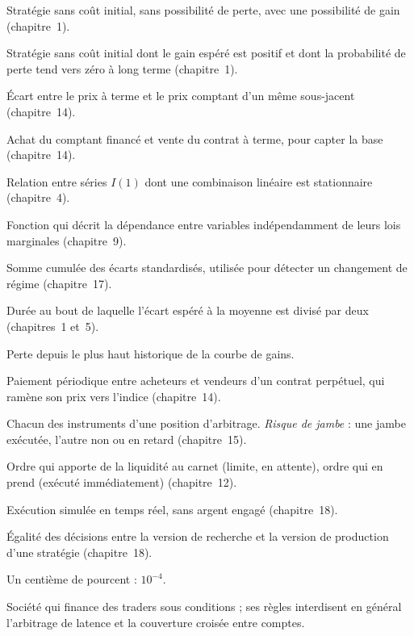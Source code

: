 \begin{description}[leftmargin=0pt,itemsep=0.3em]
\item[Arbitrage pur.] Stratégie sans coût initial, sans possibilité de perte, avec une possibilité de gain (chapitre~1).
\item[Arbitrage statistique.] Stratégie sans coût initial dont le gain espéré est positif et dont la probabilité de perte tend vers zéro à long terme (chapitre~1).
\item[Base.] Écart entre le prix à terme et le prix comptant d'un même sous-jacent (chapitre~14).
\item[\emph{Cash-and-carry}.] Achat du comptant financé et vente du contrat à terme, pour capter la base (chapitre~14).
\item[Cointégration.] Relation entre séries $I(1)$ dont une combinaison linéaire est stationnaire (chapitre~4).
\item[Copule.] Fonction qui décrit la dépendance entre variables indépendamment de leurs lois marginales (chapitre~9).
\item[CUSUM.] Somme cumulée des écarts standardisés, utilisée pour détecter un changement de régime (chapitre~17).
\item[Demi-vie.] Durée au bout de laquelle l'écart espéré à la moyenne est divisé par deux (chapitres~1 et~5).
\item[\emph{Drawdown}.] Perte depuis le plus haut historique de la courbe de gains.
\item[\emph{Funding}.] Paiement périodique entre acheteurs et vendeurs d'un contrat perpétuel, qui ramène son prix vers l'indice (chapitre~14).
\item[Jambe.] Chacun des instruments d'une position d'arbitrage. \emph{Risque de jambe} : une jambe exécutée, l'autre non ou en retard (chapitre~15).
\item[\emph{Maker}, \emph{taker}.] Ordre qui apporte de la liquidité au carnet (limite, en attente), ordre qui en prend (exécuté immédiatement) (chapitre~12).
\item[\emph{Paper trading}.] Exécution simulée en temps réel, sans argent engagé (chapitre~18).
\item[Parité.] Égalité des décisions entre la version de recherche et la version de production d'une stratégie (chapitre~18).
\item[Point de base (pb).] Un centième de pourcent : $10^{-4}$.
\item[\emph{Prop firm}.] Société qui finance des traders sous conditions ; ses règles interdisent en général l'arbitrage de latence et la couverture croisée entre comptes.

\end{description}
